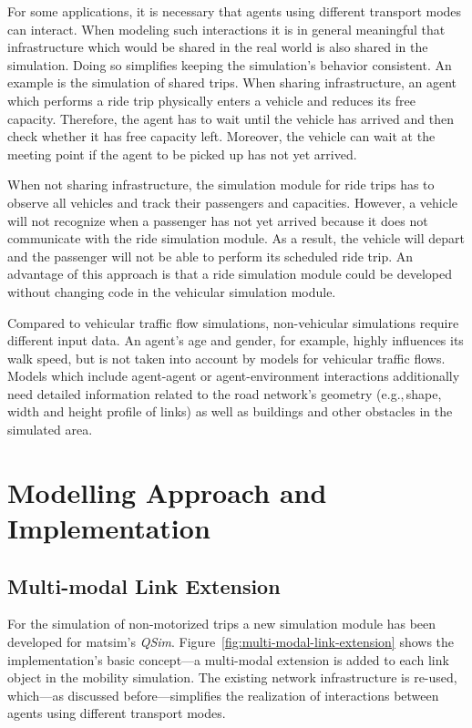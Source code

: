 For some applications, it is necessary that agents using different transport modes can interact. When modeling such interactions it is in general meaningful that infrastructure which would be shared in the real world is also shared in the simulation. Doing so simplifies keeping the simulation's behavior consistent. An example is the simulation of shared trips. When sharing infrastructure, an agent which performs a ride trip physically enters a vehicle and reduces its free capacity. Therefore, the agent has to wait until the vehicle has arrived and then check whether it has free capacity left. Moreover, the vehicle can wait at the meeting point if the agent to be picked up has not yet arrived.

When not sharing infrastructure, the simulation module for ride trips has to observe all vehicles and track their passengers and capacities. However, a vehicle will not recognize when a passenger has not yet arrived because it does not communicate with the ride simulation module. As a result, the vehicle will depart and the passenger will not be able to perform its scheduled ride trip. An advantage of this approach is that a ride simulation module could be developed without changing code in the vehicular simulation module.

Compared to vehicular traffic flow simulations, non-vehicular simulations require different input data. An agent's age and gender, for example, highly influences its walk speed, but is not taken into account by models for vehicular traffic flows. Models which include agent-agent or agent-environment interactions additionally need detailed information related to the road network's geometry (e.g.,\,shape, width and height profile of links) as well as buildings and other obstacles in the simulated area.

\section{Modelling Approach and Implementation}
\subsection{Multi-modal Link Extension} 
\label{sec:Multi-modalSimulation}
For the simulation of non-motorized trips a new simulation module has been developed for \gls{matsim}'s \emph{QSim}. Figure~\ref{fig:multi-modal-link-extension} shows the implementation's basic concept---a multi-modal extension is added to each link object in the mobility simulation. The existing network infrastructure is re-used, which---as discussed before---simplifies the realization of interactions between agents using different transport modes.

